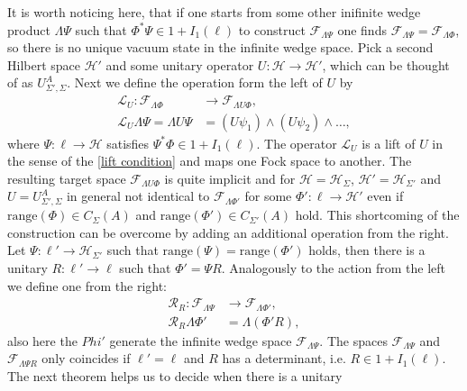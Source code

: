 \documentclass[b5paper,draft,openbib,12pt]{memoir}
\begin{document}
It is worth noticing here, that if one starts from some other
inifinite wedge product \(\mathsf{\Lambda}\Psi\) such that 
\(\Phi^*\Psi \in 1+I_1(\ell)\) to construct 
\(\mathcal{F}_{\mathsf{\Lambda} \Psi}\) one finds 
\(\mathcal{F}_{\mathsf{\Lambda} \Psi}=\mathcal{F}_{\mathsf{\Lambda} \Phi}\),
so there is no unique vacuum state in the infinite wedge space.
Pick a second Hilbert space \(\mathcal{H}'\) and some unitary 
operator \(U:\mathcal{H}\rightarrow \mathcal{H}'\), which 
can be thought of as \(U^A_{\Sigma',\Sigma}\). Next we define 
the operation form the left of \(U\) by 
\begin{align}
  \mathcal{L}_{U}:\mathcal{F}_{\mathsf{\Lambda}\Phi}&\rightarrow \mathcal{F}_{\mathsf{\Lambda}U\Phi}, \\
  \mathcal{L}_U \mathsf{\Lambda}\Psi= \mathsf{\Lambda}U\Psi&= (U\psi_1)\wedge (U\psi_2)\wedge\dots, 
\end{align}
where \(\Psi:\ell\rightarrow \mathcal{H}\) satisfies 
\(\Psi^*\Phi\in 1+I_1(\ell)\). The operator \(\mathcal{L}_U\)
is a lift of \(U\) in the sense of the
\eqref{lift condition} and maps one Fock space 
to another. 
The resulting target space 
\(\mathcal{F}_{\mathsf{\Lambda}U\Phi}\) is quite implicit 
and for \(\mathcal{H}=\mathcal{H}_{\Sigma}\),
\(\mathcal{H}'=\mathcal{H}_{\Sigma'}\) and 
\(U=U^A_{\Sigma',\Sigma}\) in general not identical to 
\(\mathcal{F}_{\mathsf{\Lambda}\Phi'}\) for some 
\(\Phi':\ell \rightarrow \mathcal{H}'\) even if 
\(\mathrm{range}(\Phi)\in C_\Sigma(A) \) and 
\(\mathrm{range}(\Phi')\in C_{\Sigma'}(A)\) hold. 
This shortcoming of the construction can be overcome 
by adding an additional operation from the right.
Let \(\Psi:\ell' \rightarrow \mathcal{H}_{\Sigma'}\) such 
that \(\mathrm{range}(\Psi)=\mathrm{range}(\Phi')\)
holds, then there is a unitary 
\(R:\ell'\rightarrow \ell\) such that 
\(\Phi'=\Psi R\). Analogously to the action from the left
we define one from the right:
\begin{align}
  \mathcal{R}_{R}:\mathcal{F}_{\mathsf{\Lambda}\Psi}&\rightarrow \mathcal{F}_{\mathsf{\Lambda}\Phi'}, \\
  \mathcal{R}_R \mathsf{\Lambda}\Phi'&= \mathsf{\Lambda}(\Phi' R),
\end{align}
also here the \(Phi'\) generate the infinite wedge space 
\(\mathcal{F}_{\mathsf{\Lambda}\Psi}\). The spaces 
\(\mathcal{F}_{\mathsf{\Lambda}\Psi}\) and 
\(\mathcal{F}_{\mathsf{\Lambda}\Psi R}\) only coincides if 
\(\ell'=\ell\) and
\(R\) has a determinant, i.e. \(R\in 1+I_1(\ell)\). The next
theorem helps us to decide when there is a unitary 
\end{document}

